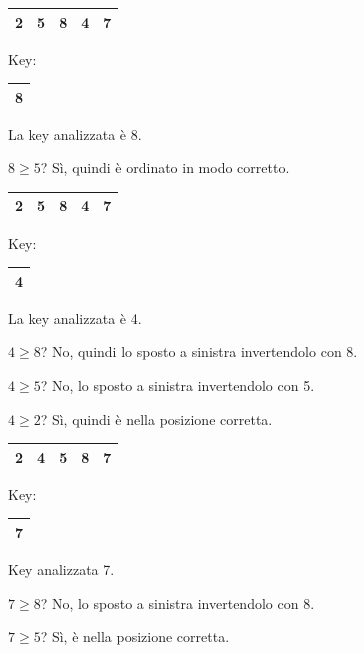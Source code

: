 \begin{center}
	\begin{tabular}{|l|l|l|l|l|}
		\hline
		2 & 5 & 8 & 4 & 7 \\
		\hline
	\end{tabular}
	\hspace{1cm} Key: 
	\begin{tabular}{|l|}
		\hline
		8 \\
		\hline
	\end{tabular}
\end{center}

\noindent La key analizzata è 8. \par
$8 \geq 5$? Sì, quindi è ordinato in modo corretto.

\begin{center}
	\begin{tabular}{|l|l|l|l|l|}
		\hline
		2 & 5 & 8 & 4 & 7 \\
		\hline
	\end{tabular}
	\hspace{1cm} Key: 
	\begin{tabular}{|l|}
		\hline
		4 \\
		\hline
	\end{tabular}
\end{center}

\noindent La key analizzata è 4.\par
$4 \geq 8$? No, quindi lo sposto a sinistra invertendolo con 8.\par 
$4 \geq 5$? No, lo sposto a sinistra invertendolo con 5.\par
$4 \geq 2$? Sì, quindi è nella posizione corretta.

\begin{center}
	\begin{tabular}{|l|l|l|l|l|}
		\hline
		2 & 4 & 5 & 8 & 7 \\
		\hline
	\end{tabular}
	\hspace{1cm} Key: 
	\begin{tabular}{|l|}
		\hline
		7 \\
		\hline
	\end{tabular}
\end{center}

\noindent Key analizzata 7. \par
$7 \geq 8$? No, lo sposto a sinistra invertendolo con 8.\par
$7 \geq 5$? Sì, è nella posizione corretta.\par

